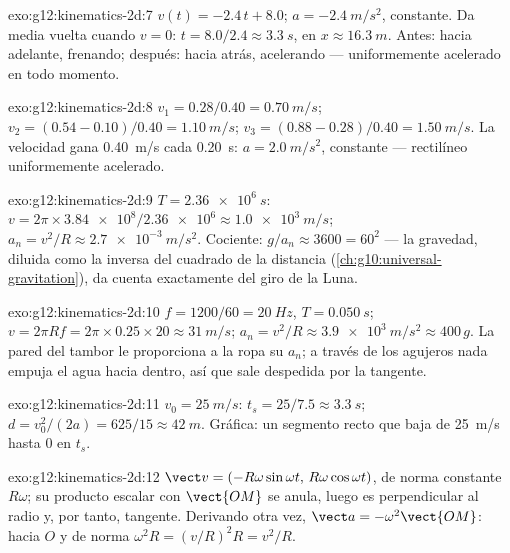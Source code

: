 \begin{solution}{exo:g12:kinematics-2d:7}
$v(t) = -2.4\,t + 8.0$; $a = \qty{-2.4}{m/s^2}$, constante. Da media
vuelta cuando $v = 0$: $t = 8.0/2.4 \approx \qty{3.3}{s}$, en
$x \approx \qty{16.3}{m}$. Antes: hacia adelante, frenando; después:
hacia atrás, acelerando --- uniformemente acelerado en todo momento.
\end{solution}

\begin{solution}{exo:g12:kinematics-2d:8}
$v_1 = 0.28/0.40 = \qty{0.70}{m/s}$;
$v_2 = (0.54 - 0.10)/0.40 = \qty{1.10}{m/s}$;
$v_3 = (0.88 - 0.28)/0.40 = \qty{1.50}{m/s}$. La velocidad gana
\qty{0.40}{m/s} cada \qty{0.20}{s}: $a = \qty{2.0}{m/s^2}$, constante
--- rectilíneo uniformemente acelerado.
\end{solution}

\begin{solution}{exo:g12:kinematics-2d:9}
$T = \qty{2.36e6}{s}$:
$v = 2\pi \times \num{3.84e8}/\num{2.36e6} \approx \qty{1.0e3}{m/s}$;
$a_n = v^2/R \approx \qty{2.7e-3}{m/s^2}$. Cociente:
$g/a_n \approx 3600 = 60^2$ --- la gravedad, diluida como la inversa del
cuadrado de la distancia (\cref{ch:g10:universal-gravitation}), da
cuenta exactamente del giro de la Luna.
\end{solution}

\begin{solution}{exo:g12:kinematics-2d:10}
$f = 1200/60 = \qty{20}{Hz}$, $T = \qty{0.050}{s}$;
$v = 2\pi R f = 2\pi \times 0.25 \times 20 \approx \qty{31}{m/s}$;
$a_n = v^2/R \approx \qty{3.9e3}{m/s^2} \approx 400\,g$. La pared del
tambor le proporciona a la ropa su $a_n$; a través de los agujeros nada
empuja el agua hacia dentro, así que sale despedida por la tangente.
\end{solution}

\begin{solution}{exo:g12:kinematics-2d:11}
$v_0 = \qty{25}{m/s}$: $t_s = 25/7.5 \approx \qty{3.3}{s}$;
$d = v_0^2/(2a) = 625/15 \approx \qty{42}{m}$. Gráfica: un segmento
recto que baja de \qty{25}{m/s} hasta $0$ en $t_s$.
\end{solution}

\begin{solution}{exo:g12:kinematics-2d:12}
$\vect v = (-R\omega\sin\omega t,\, R\omega\cos\omega t)$, de norma
constante $R\omega$; su producto escalar con $\vect{OM}$ se anula, luego
es perpendicular al radio y, por tanto, tangente. Derivando otra vez,
$\vect a = -\omega^2\vect{OM}$: hacia $O$ y de norma
$\omega^2 R = (v/R)^2 R = v^2/R$.
\end{solution}

